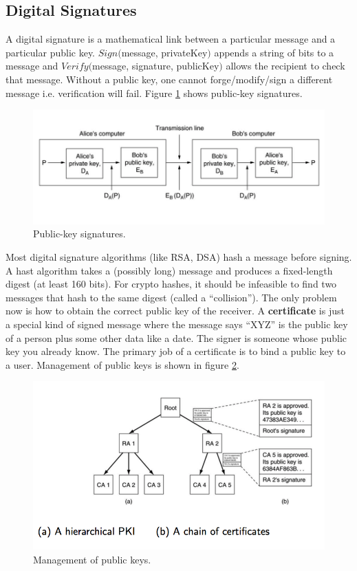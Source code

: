 \documentclass[twoside]{article}
\begin{document}
\subsection{Digital Signatures}
A digital signature is a mathematical link between a particular message and a 
particular public key. \(Sign(\)message, privateKey\()\) appends a string
of bits to a message and \(Verify(\)message, signature, publicKey\()\) 
allows the recipient to check that message. Without a public key, one cannot
forge/modify/sign a different message i.e. verification will fail. Figure
\ref{fig:signs} shows public-key signatures.
\begin{figure}
  \includegraphics[width=\linewidth]{signs.png}
  \caption{Public-key signatures.}
  \label{fig:signs}
\end{figure}
Most digital signature algorithms (like RSA, DSA) hash a message before signing.
A hast algorithm takes a (possibly long) message and produces a fixed-length
digest (at least 160 bits). For crypto hashes, it should be infeasible to 
find two messages that hash to the same digest (called a ``collision''). The 
only problem now is how to obtain the correct public key of the receiver. A 
\textbf{certificate} is just a special kind of signed message where the message
says ``XYZ'' is the public key of a person plus some other data like a date. 
The signer is someone whose public key you already know. The primary job of
a certificate is to bind a public key to a user. Management of public keys 
is shown in figure \ref{fig:key-manage}.
\begin{figure}
  \includegraphics[width=\linewidth]{key-manage.png}
  \caption{Management of public keys.}
  \label{fig:key-manage}
\end{figure}
\end{document}
